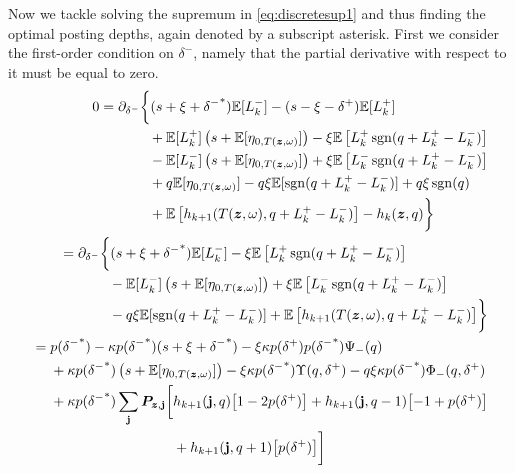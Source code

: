 Now we tackle solving the supremum in \autoref{eq:discretesup1} and thus finding the optimal posting depths, again denoted by a subscript asterisk. First we consider the first-order condition on $\delta^-$, namely that the partial derivative with respect to it must be equal to zero.
\begin{align}
\begin{split}
0 & = \partial_{\delta^-} \biggl\lbrace 
(s + \xi + {\delta^-}^*)\E [L_k^-] - (s - \xi - \delta^+)\E[L_k^+] \\
& \hphantom{\partial_{\delta^-} \biggl\lbrace {}+{}} + \E[L_k^+] \left( s + \E[\eta_{0,T(\bz, \omega)}] \right)  - \xi \E \left[L_k^+ \sgn( q + L_k^+ - L_k^-) \right] \\
& \hphantom{\partial_{\delta^-} \biggl\lbrace {}+{}} - \E[L_k^-] \left( s + \E[\eta_{0,T(\bz, \omega)}] \right) + \xi \E \left[ L_k^- \sgn( q + L_k^+ - L_k^-) \right] \\
& \hphantom{\partial_{\delta^-} \biggl\lbrace {}+{}} + q \E[ \eta_{0,T(\bz, \omega)}]  - q \xi \E[ \sgn( q + L_k^+ - L_k^-)] + q \xi \sgn(q)  \\
& \hphantom{\partial_{\delta^-} \biggl\lbrace {}+{}} + \E \left[ h_{k+1}(T(\bz,\omega), q + L_k^+ - L_k^- ) \right] -  h_k(\bz,q) \biggr\rbrace
\end{split} \\
\begin{split}
& = \partial_{\delta^-} \biggl\lbrace 
(s + \xi + {\delta^-}^*)\E [L_k^-] - \xi \E \left[L_k^+ \sgn( q + L_k^+ - L_k^-) \right] \\
& \hphantom{\partial_{\delta^-} \biggl\lbrace {}+{}} - \E[L_k^-] \left( s + \E[\eta_{0,T(\bz, \omega)}] \right) + \xi \E \left[ L_k^- \sgn( q + L_k^+ - L_k^-) \right] \\
& \hphantom{\partial_{\delta^-} \biggl\lbrace {}+{}} - q \xi \E[ \sgn( q + L_k^+ - L_k^-)]  + \E \left[ h_{k+1}(T(\bz,\omega), q + L_k^+ - L_k^- ) \right]  \biggr\rbrace
\end{split} \\
\begin{split}
& = p({\delta^-}^*) - \kappa p({\delta^-}^*) (s + \xi + {\delta^-}^*) - \xi \kappa p(\delta^+)p({\delta^-}^*)\Psi_-(q) \\
& \hphantom{{}={}} + \kappa p({\delta^-}^*) \left( s + \E[\eta_{0,T(\bz, \omega)}] \right) - \xi \kappa p({\delta^-}^*) \Upsilon(q,\delta^+) - q \xi \kappa p({\delta^-}^*) \Phi_-(q,\delta^+) \\
& \hphantom{{}={}} + \kappa p({\delta^-}^*) \sum_\bj \bP_{\bz,\bj} \biggl[ h_{k+1}(\bj, q) \bigl[ 1 - 2 p(\delta^+) \bigr] + h_{k+1}(\bj, q-1) \bigl[-1 + p(\delta^+) \bigr] \\
& \hphantom{{}={} + \kappa p({\delta^-}^*) \sum_\bj \bP_{\bz,\bj} \biggl[} + h_{k+1}(\bj, q+1) \bigl[ p(\delta^+) \bigr] \biggr]
\end{split}
\end{align}

